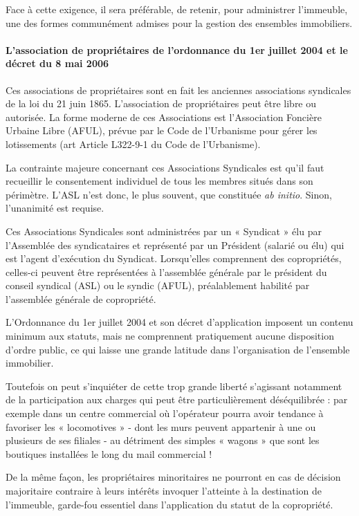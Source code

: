 		Face à cette exigence, il sera préférable, de retenir, pour administrer l’immeuble, une des formes
		communément admises pour la gestion des ensembles immobiliers.
		
		\paragraph{L'association de propriétaires de l’ordonnance du 1er juillet 2004 et le décret du 8 mai 2006}
			Ces associations de propriétaires sont en fait les anciennes associations syndicales de la loi du 21 juin 1865.
			L’association de propriétaires peut être libre ou autorisée. La forme moderne de ces Associations est
			l’Association Foncière Urbaine Libre (AFUL), prévue par le Code de l’Urbanisme pour gérer les lotissements
			(art Article L322-9-1 du Code de l’Urbanisme).
			
			La contrainte majeure concernant ces Associations Syndicales est qu’il faut recueillir le consentement
			individuel de tous les membres situés dans son périmètre. L’ASL n’est donc, le plus souvent, que constituée
			\emph{ab initio}. Sinon, l’unanimité est requise.
			
			Ces Associations Syndicales sont administrées par un « Syndicat » élu par l'Assemblée des syndicataires et
			représenté par un Président (salarié ou élu) qui est l'agent d'exécution du Syndicat. Lorsqu’elles
			comprennent des copropriétés, celles-ci peuvent être représentées à l’assemblée générale par le
			président du conseil syndical (ASL) ou le syndic (AFUL), préalablement habilité par l’assemblée générale
			de copropriété.
			
			L’Ordonnance du 1er juillet 2004 et son décret d’application imposent un contenu minimum aux statuts,
			mais ne comprennent pratiquement aucune disposition d’ordre public, ce qui laisse une grande latitude
			dans l’organisation de l’ensemble immobilier.
	
			Toutefois on peut s’inquiéter de cette trop grande liberté s’agissant notamment de la participation aux
			charges qui peut être particulièrement déséquilibrée : par exemple dans un centre commercial où
			l’opérateur pourra avoir tendance à favoriser les « locomotives » - dont les murs peuvent appartenir à une
			ou plusieurs de ses filiales - au détriment des simples « wagons » que sont les boutiques installées le long
			du mail commercial !
			
			De la même façon, les propriétaires minoritaires ne pourront en cas de décision majoritaire contraire à
			leurs intérêts invoquer l’atteinte à la destination de l’immeuble, garde-fou essentiel dans l’application du
			statut de la copropriété.
			
